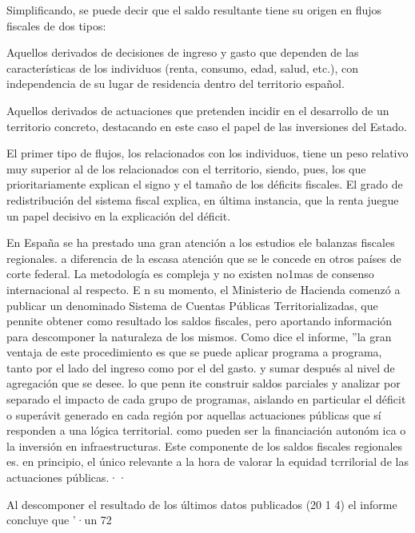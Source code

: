 \documentclass[10pt,a4paper]{article}
\begin{document}
{Simplificando, se puede decir que el saldo resultante tiene su origen en flujos fiscales de dos tipos: 

Aquellos derivados de decisiones de ingreso y gasto que dependen de las características de los individuos (renta, consumo, edad, salud, etc.), con independencia de su lugar de residencia dentro del territorio español.

Aquellos derivados de actuaciones que pretenden incidir en el desarrollo de un territorio concreto, destacando en este caso el papel de las inversiones del Estado.

El primer tipo de flujos, los relacionados con los individuos, tiene un peso relativo muy superior al de los relacionados con el territorio, siendo, pues, los que prioritariamente explican el signo y el tamaño de los déficits fiscales. El grado de redistribución del sistema fiscal explica, en última instancia, que la renta juegue un papel decisivo en la explicación del déficit.

En España se ha prestado una gran atención a los estudios ele balanzas fiscales regionales. a diferencia de la escasa atención que se le concede en otros países de corte federal. La metodología es compleja y no existen no1mas de consenso internacional al respecto. E n su momento, el Ministerio de Hacienda comenzó a publicar un denominado Sistema de Cuentas Públicas Territorializadas, que pennite obtener como resultado los saldos fiscales, pero aportando información para descomponer la naturaleza de los mismos. Como dice el informe, ''la gran ventaja de este procedimiento es que se puede aplicar programa a programa, tanto por el lado del ingreso como por el del gasto. y sumar después al nivel de agregación que se desee. lo que penn ite construir saldos parciales y analizar por separado el impacto de cada grupo de programas, aislando en particular el déficit o superávit generado en cada región por aquellas actuaciones públicas que sí responden a una lógica territorial. como pueden ser la financiación autonóm ica o la inversión en infraestructuras. Este componente de los saldos fiscales regionales es. en principio, el único relevante a la hora de valorar la equidad tcrrilorial de las actuaciones públicas.··

Al descomponer el resultado de los últimos datos publicados (20 1 4) el informe concluye que '·un 72%

}
\end{document}
